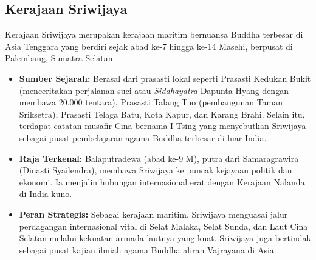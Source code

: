 \documentclass[12pt, a4paper]{article}
\begin{document}
\subsection{Kerajaan Sriwijaya}
Kerajaan Sriwijaya merupakan kerajaan maritim bernuansa Buddha terbesar di Asia Tenggara yang berdiri sejak abad ke-7 hingga ke-14 Masehi, berpusat di Palembang, Sumatra Selatan.
\begin{itemize}
	\item \textbf{Sumber Sejarah:} Berasal dari prasasti lokal seperti Prasasti Kedukan Bukit (menceritakan perjalanan suci atau \textit{Siddhayatra} Dapunta Hyang dengan membawa 20.000 tentara), Prasasti Talang Tuo (pembangunan Taman Sriksetra), Prasasti Telaga Batu, Kota Kapur, dan Karang Brahi. Selain itu, terdapat catatan musafir Cina bernama I-Tsing yang menyebutkan Sriwijaya sebagai pusat pembelajaran agama Buddha terbesar di luar India.
	\item \textbf{Raja Terkenal:} Balaputradewa (abad ke-9 M), putra dari Samaragrawira (Dinasti Syailendra), membawa Sriwijaya ke puncak kejayaan politik dan ekonomi. Ia menjalin hubungan internasional erat dengan Kerajaan Nalanda di India kuno.
	\item \textbf{Peran Strategis:} Sebagai kerajaan maritim, Sriwijaya menguasai jalur perdagangan internasional vital di Selat Malaka, Selat Sunda, dan Laut Cina Selatan melalui kekuatan armada lautnya yang kuat. Sriwijaya juga bertindak sebagai pusat kajian ilmiah agama Buddha aliran Vajrayana di Asia.
\end{itemize}
\end{document}
